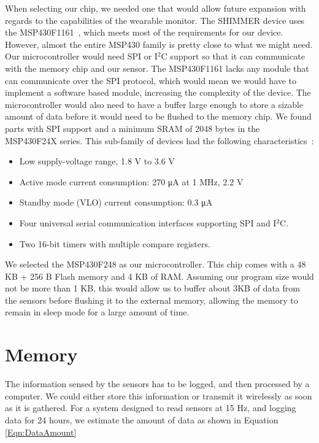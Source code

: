 When selecting our chip,
we needed one that would allow future expansion with regards to the capabilities of the wearable monitor.
The SHIMMER device uses the MSP430F1161~\cite{Web:ShimmerHome},
which meets most of the requirements for our device. 
However, almost the entire MSP430 family is pretty close to what we might need.
Our microcontroller would need SPI or I$^2$C support so that it can communicate with the memory chip and our sensor.
The MSP430F1161 lacks any module that can communicate over the SPI protocol,
which would mean we would have to implement a software based module,
increasing the complexity of the device.
The microcontroller would also need to have a buffer large enough to store
a sizable amount of data before it would need to be flushed to the memory chip.
We found parts with SPI support and
a minimum SRAM of 2048 bytes in the MSP430F24X series. This sub-family of devices had
the following characteristics~\cite{msp430F24xfamily}:

\begin{itemize}
	\item Low supply-voltage range, 1.8 V to 3.6 V
	\item Active mode current consumption: 270 μA at 1 MHz, 2.2 V
	\item Standby mode (VLO) current consumption: 0.3 μA
	\item Four universal serial communication interfaces supporting SPI and I$^2$C.
	\item Two 16-bit timers with multiple compare registers.
\end{itemize}
We selected the MSP430F248 as our microcontroller. This chip comes with a 48 KB + 256 B Flash memory and 4 KB of RAM. Assuming our program size would not be more than 1 KB, this would allow us to buffer about 3KB of data from the sensors before flushing it to the external memory, allowing the memory to remain in sleep mode for a large amount of time.

\section{Memory}
\label{Sec:Memory}

The information sensed by the sensors has to be logged, and then processed by a computer. We could either store this information or transmit it wirelessly as soon as it is gathered. For a system designed to read sensors at 15 Hz, and logging data for 24 hours, we estimate the amount of data as shown in Equation \ref{Eqn:DataAmount}

